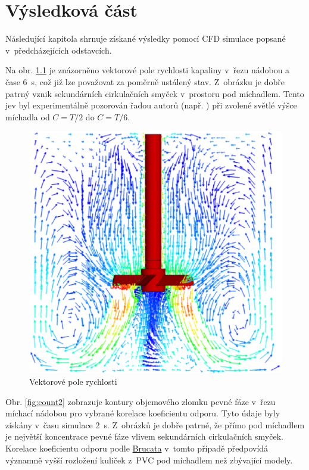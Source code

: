 \chapter{Výsledková část}
Následující kapitola shrnuje získané výsledky pomocí CFD simulace popsané v~předcházejících odstavcích. 

Na obr. \ref{fig:vecfield} je znázorněno vektorové pole rychlosti kapaliny v~řezu nádobou a čase \SI{6}{\second}, což již lze považovat za poměrně ustálený stav. Z~obrázku je dobře patrný vznik sekundárních cirkulačních smyček v~prostoru pod míchadlem. Tento jev byl experimentálně pozorován řadou autorů (např. \citet{hos10}) při zvolené světlé výšce míchadla od $C=T/2$ do $C=T/6$.  

\begin{figure}[h!]
\begin{center}
\includegraphics[scale=0.45]{images/vecfield.eps}
\caption{Vektorové pole rychlosti}
\label{fig:vecfield}
\end{center}
\end{figure} 

\vspace{-12mm}
\newpage

Obr. \ref{fig:count2} zobrazuje kontury objemového zlomku pevné fáze v~řezu míchací nádobou pro vybrané korelace koeficientu odporu. Tyto údaje byly získány v~času simulace \SI{2}{\second}. Z~obrázků je dobře patrné, že přímo pod míchadlem je největší koncentrace pevné fáze vlivem sekundárních cirkulačních smyček. Korelace koeficientu odporu podle \hyperlink{hyp:cds}{Brucata} v~tomto případě předpovídá významně vyšší rozložení kuliček z~PVC pod míchadlem než zbývající modely.

